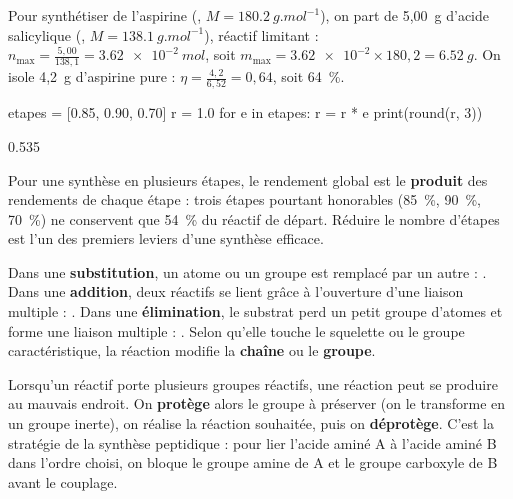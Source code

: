 \begin{exemple}
Pour synthétiser de l'aspirine (, $M=\qty{180,2}{g.mol^{-1}}$), on part de 5,00~g d'acide salicylique
(, $M=\qty{138,1}{g.mol^{-1}}$), réactif limitant : $n_{\max}=\frac{5{,}00}{138{,}1}=\qty{3,62e-2}{mol}$,
soit $m_{\max}=\num{3.62e-2}\times180{,}2=\qty{6,52}{g}$. On isole 4,2~g d'aspirine pure :
$\eta=\frac{4{,}2}{6{,}52}=0{,}64$, soit 64~\%.
\end{exemple}
\begin{codecote}[0.56]
\begin{pythoncol}
etapes = [0.85, 0.90, 0.70]
r = 1.0
for e in etapes:
    r = r * e
print(round(r, 3))
\end{pythoncol}
\begin{consolecol}
0.535
\end{consolecol}
\cote
\fontsize{9.5}{12.5}\selectfont
{}\par\smallskip
Pour une synthèse en plusieurs étapes, le rendement global est le \textbf{produit} des rendements de chaque étape :
trois étapes pourtant honorables (85~\%, 90~\%, 70~\%) ne conservent que 54~\% du réactif de départ. Réduire le nombre
d'étapes est l'un des premiers leviers d'une synthèse efficace.
\end{codecote}
\begin{definition}
Dans une \textbf{substitution}, un atome ou un groupe est remplacé par un autre : . Dans
une \textbf{addition}, deux réactifs se lient grâce à l'ouverture d'une liaison multiple :
. Dans une \textbf{élimination}, le substrat perd un petit groupe d'atomes et forme une
liaison multiple : . Selon qu'elle touche le squelette ou le groupe
caractéristique, la réaction modifie la \textbf{chaîne} ou le \textbf{groupe}.
\end{definition}
\begin{propriete}
Lorsqu'un réactif porte plusieurs groupes réactifs, une réaction peut se produire au mauvais endroit. On
\textbf{protège} alors le groupe à préserver (on le transforme en un groupe inerte), on réalise la réaction souhaitée,
puis on \textbf{déprotège}. C'est la stratégie de la synthèse peptidique : pour lier l'acide aminé A à l'acide aminé B
dans l'ordre choisi, on bloque le groupe amine de A et le groupe carboxyle de B avant le couplage.
\end{propriete}
